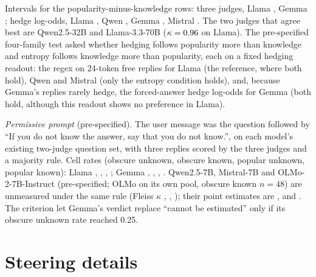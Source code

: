 \documentclass{article}
\begin{document}
Intervals for the popularity-minus-knowledge rows: three judges, Llama \tjLlamaDiffCI, Gemma \tjGemmaDiffCI; hedge log-odds, Llama \loLlamaDiffCI, Qwen \loQwenDiffCI, Gemma \loGemmaDiffCI, Mistral \loMistralDiffCI. The two judges that agree best are Qwen2.5-32B and Llama-3.3-70B ($\kappa=0.96$ on Llama). The pre-specified four-family test asked whether hedging follows popularity more than knowledge and entropy follows knowledge more than popularity, each on a fixed hedging readout: the regex on 24-token free replies for Llama (the reference, where both hold), Qwen and Mistral (only the entropy condition holds), and, because Gemma's replies rarely hedge, the forced-answer hedge log-odds for Gemma (both hold, although this readout shows no preference in Llama).

\emph{Permissive prompt} (pre-specified). The user message was the question followed by ``If you do not know the answer, say that you do not know.'', on each model's existing two-judge question set, with three replies scored by the three judges and a majority rule. Cell rates (obscure unknown, obscure known, popular unknown, popular known): Llama \pmLlamaObsUnk, \pmLlamaObsKnown, \pmLlamaPopUnk, \pmLlamaPopKnown; Gemma \pmGemmaObsUnk, \pmGemmaObsKnown, \pmGemmaPopUnk, \pmGemmaPopKnown. Qwen2.5-7B, Mistral-7B and OLMo-2-7B-Instruct (pre-specified; OLMo on its own pool, obscure known $n=48$) are unmeasured under the same rule (Fleiss $\kappa$ \pmQwenKappa, \pmMistralKappa, \pmOlmoKappa); their point estimates are \pmQwenDiff{} \pmQwenDiffCI, \pmMistralDiff{} \pmMistralDiffCI{} and \pmOlmoDiff{} \pmOlmoDiffCI. The criterion let Gemma's verdict replace ``cannot be estimated'' only if its obscure unknown rate reached 0.25.

\section{Steering details}
\label{app:steer}
\end{document}
